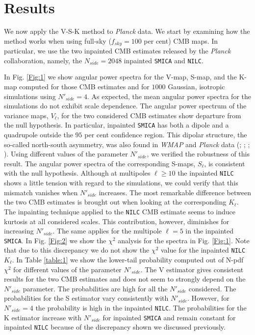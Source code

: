 \section{Results}
\label{s:results}

We now apply the V-S-K method to \textit{Planck} data. We start by examining how the method works when using full-sky ($f_{sky}=100$ per cent) CMB maps. In particular, we use the two inpainted CMB estimates released by the \textit{Planck} collaboration, namely, the $N_{side}=2048$ inpainted \texttt{SMICA} and \texttt{NILC}. 

In Fig. \ref{Fig:1} we show angular power spectra for the V-map, S-map, and the K-map computed for those CMB estimates and for $1000$ Gaussian, isotropic simulations using $N'_{side} = 4$. As expected, the mean angular power spectra for the simulations do not exhibit scale dependence. The angular power spectrum of the variance maps, $V_{\ell}$, for the two considered CMB estimates show  departure from the null hypothesis. In particular, inpainted \texttt{SMICA} has both a dipole and a quadrupole outside the $95$ per cent confidence region. This dipolar structure,  the so-called north-south asymmetry, was also found in \textit{WMAP} and \textit{Planck} data (\cite{Eriksen2004}; \cite{Hansen2009}; \cite{PlanckXXIII}; \cite{Akrami2014a}). Using different values of the parameter $N'_{side}$, we verified the robustness of this result. The angular power spectra of the corresponding S-maps, $S_{\ell}$, is consistent with the null hypothesis. Although at multipoles $\ell \geq 10$ the inpainted \texttt{NILC} shows  a little tension with regard to the simulations, we could verify that this mismatch vanishes when $N'_{side}$ increases. The most remarkable difference between the two CMB estimates is brought out when looking at the corresponding $K_{\ell}$. The inpainting technique applied to the \texttt{NILC} CMB estimate seems to induce kurtosis at all considered scales. This contribution, however, diminishes for increasing $N'_{side}$. The same applies for the multipole $\ell=5$ in the inpainted \texttt{SMICA}. In Fig. \ref{Fig:2} we show the $\chi^2$ analysis for the spectra in Fig. \ref{Fig:1}. Note that due to this discrepancy we do not show the $\chi^2$ value for the inpainted \texttt{NILC} $K_{\ell}$. In Table \ref{table:1} we show the lower-tail probability computed out of N-pdf $\chi^2$ for different values of the parameter $N'_{side}$. The V estimator gives consistent results for the two CMB estimates and does not seem to strongly depend on the $N'_{side}$ parameter. The probabilities are high for all the $N'_{side}$ considered. The probabilities for the S estimator vary consistently with $N'_{side}$. However, for $N'_{side}=4$ the probability is high in the inpainted \texttt{NILC}. The probabilities for the K estimator increase with $N'_{side}$ for inpainted \texttt{SMICA} and remain constant for inpainted \texttt{NILC} because of the discrepancy shown we discussed previously.

